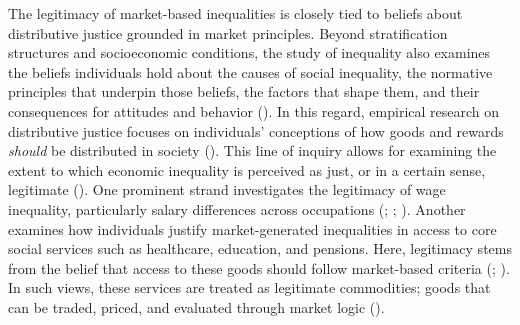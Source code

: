 \documentclass[
  12pt,
]{article}
\begin{document}
The legitimacy of market-based inequalities is closely tied to beliefs
about distributive justice grounded in market principles. Beyond
stratification structures and socioeconomic conditions, the study of
inequality also examines the beliefs individuals hold about the causes
of social inequality, the normative principles that underpin those
beliefs, the factors that shape them, and their consequences for
attitudes and behavior (). In this regard, empirical research on distributive
justice focuses on individuals' conceptions of how goods and rewards
\emph{should} be distributed in society
(). This line of inquiry allows for examining the extent to which
economic inequality is perceived as just, or in a certain sense,
legitimate ().
One prominent strand investigates the legitimacy of wage inequality,
particularly salary differences across occupations
(;
;
). Another
examines how individuals justify market-generated inequalities in access
to core social services such as healthcare, education, and pensions.
Here, legitimacy stems from the belief that access to these goods should
follow market-based criteria
(;
). In such views, these
services are treated as legitimate commodities; goods that can be
traded, priced, and evaluated through market logic
().
\end{document}
